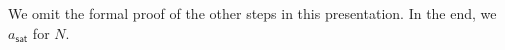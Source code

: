 



We omit the formal proof of the other steps in this presentation. In the end, we  $a_{\textsf{sat}}$ for $N$. 

